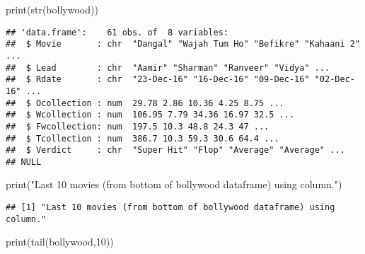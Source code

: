\documentclass[
]{article}
\newenvironment{Shaded}{\begin{snugshade}}{\end{snugshade}}
\newcommand{\DecValTok}[1]{\textcolor[rgb]{0.00,0.00,0.81}{#1}}
\newcommand{\FunctionTok}[1]{\textcolor[rgb]{0.00,0.00,0.00}{#1}}
\newcommand{\NormalTok}[1]{#1}
\newcommand{\StringTok}[1]{\textcolor[rgb]{0.31,0.60,0.02}{#1}}
\begin{document}
\begin{Shaded}
\begin{Highlighting}[]
\FunctionTok{print}\NormalTok{(}\FunctionTok{str}\NormalTok{(bollywood))}
\end{Highlighting}
\end{Shaded}

\begin{verbatim}
## 'data.frame':    61 obs. of  8 variables:
##  $ Movie       : chr  "Dangal" "Wajah Tum Ho" "Befikre" "Kahaani 2" ...
##  $ Lead        : chr  "Aamir" "Sharman" "Ranveer" "Vidya" ...
##  $ Rdate       : chr  "23-Dec-16" "16-Dec-16" "09-Dec-16" "02-Dec-16" ...
##  $ Ocollection : num  29.78 2.86 10.36 4.25 8.75 ...
##  $ Wcollection : num  106.95 7.79 34.36 16.97 32.5 ...
##  $ Fwcollection: num  197.5 10.3 48.8 24.3 47 ...
##  $ Tcollection : num  386.7 10.3 59.3 30.6 64.4 ...
##  $ Verdict     : chr  "Super Hit" "Flop" "Average" "Average" ...
## NULL
\end{verbatim}

\begin{Shaded}
\begin{Highlighting}[]
\FunctionTok{print}\NormalTok{(}\StringTok{"Last 10 movies (from bottom of bollywood dataframe) using column."}\NormalTok{)}
\end{Highlighting}
\end{Shaded}

\begin{verbatim}
## [1] "Last 10 movies (from bottom of bollywood dataframe) using column."
\end{verbatim}

\begin{Shaded}
\begin{Highlighting}[]
\FunctionTok{print}\NormalTok{(}\FunctionTok{tail}\NormalTok{(bollywood,}\DecValTok{10}\NormalTok{))}
\end{Highlighting}
\end{Shaded}
\end{document}
